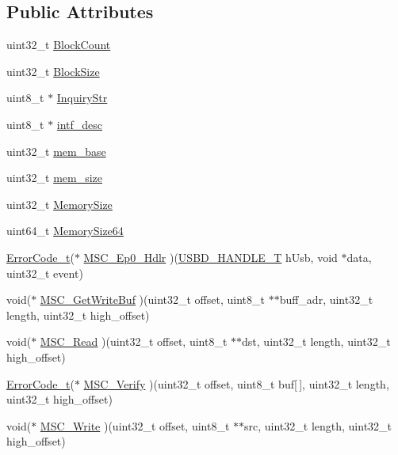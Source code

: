 \subsection*{Public Attributes}
\begin{DoxyCompactItemize}
\item 
uint32\+\_\+t \hyperlink{structUSBD__MSC__INIT__PARAM_a88951ad7bc026318e18eadf372804caa}{Block\+Count}
\item 
uint32\+\_\+t \hyperlink{structUSBD__MSC__INIT__PARAM_af0ed8a5b4aec5f19e1b15c1ab3c3dcbd}{Block\+Size}
\item 
uint8\+\_\+t $\ast$ \hyperlink{structUSBD__MSC__INIT__PARAM_a84e110f5e1d448f9c35e9e8583429df8}{Inquiry\+Str}
\item 
uint8\+\_\+t $\ast$ \hyperlink{structUSBD__MSC__INIT__PARAM_a308fc23cd32876dcdc914d2223f8f7c4}{intf\+\_\+desc}
\item 
uint32\+\_\+t \hyperlink{structUSBD__MSC__INIT__PARAM_a1ab6b66d44ad7db8c2ded5e2f4200aae}{mem\+\_\+base}
\item 
uint32\+\_\+t \hyperlink{structUSBD__MSC__INIT__PARAM_a33048544944f306ae198de18468309b4}{mem\+\_\+size}
\item 
uint32\+\_\+t \hyperlink{structUSBD__MSC__INIT__PARAM_af5cecd156943a33ccaa619ea8a9d596d}{Memory\+Size}
\item 
uint64\+\_\+t \hyperlink{structUSBD__MSC__INIT__PARAM_abca96b7a6d9b77020bdca1ffdd153e56}{Memory\+Size64}
\item 
\hyperlink{error_8h_a905255056c349318139d94aa4523d516}{Error\+Code\+\_\+t}($\ast$ \hyperlink{structUSBD__MSC__INIT__PARAM_a9d79a4a1054e7ecb88c7a2b51aa3d4c8}{M\+S\+C\+\_\+\+Ep0\+\_\+\+Hdlr} )(\hyperlink{group__USBD__Core_gafdbb2204d929cb9d75736bd2b42342ac}{U\+S\+B\+D\+\_\+\+H\+A\+N\+D\+L\+E\+\_\+T} h\+Usb, void $\ast$data, uint32\+\_\+t event)
\item 
void($\ast$ \hyperlink{structUSBD__MSC__INIT__PARAM_a6463d6a686009289cc1a92209f276514}{M\+S\+C\+\_\+\+Get\+Write\+Buf} )(uint32\+\_\+t offset, uint8\+\_\+t $\ast$$\ast$buff\+\_\+adr, uint32\+\_\+t length, uint32\+\_\+t high\+\_\+offset)
\item 
void($\ast$ \hyperlink{structUSBD__MSC__INIT__PARAM_a6695a1fe8a7201c91ff6dadace9b7ef7}{M\+S\+C\+\_\+\+Read} )(uint32\+\_\+t offset, uint8\+\_\+t $\ast$$\ast$dst, uint32\+\_\+t length, uint32\+\_\+t high\+\_\+offset)
\item 
\hyperlink{error_8h_a905255056c349318139d94aa4523d516}{Error\+Code\+\_\+t}($\ast$ \hyperlink{structUSBD__MSC__INIT__PARAM_a8d8010352b3183a3b29c509f1d76c03c}{M\+S\+C\+\_\+\+Verify} )(uint32\+\_\+t offset, uint8\+\_\+t buf\mbox{[}$\,$\mbox{]}, uint32\+\_\+t length, uint32\+\_\+t high\+\_\+offset)
\item 
void($\ast$ \hyperlink{structUSBD__MSC__INIT__PARAM_a4f0ca241688cb8ccae080eb9e958cba3}{M\+S\+C\+\_\+\+Write} )(uint32\+\_\+t offset, uint8\+\_\+t $\ast$$\ast$src, uint32\+\_\+t length, uint32\+\_\+t high\+\_\+offset)
\end{DoxyCompactItemize}


